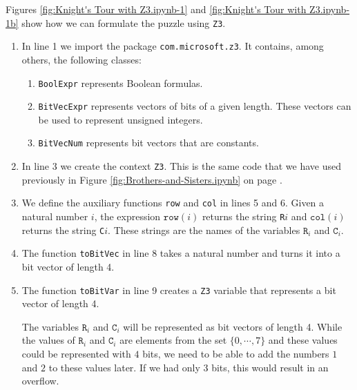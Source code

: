 Figures \ref{fig:Knight's Tour with Z3.ipynb-1} and \ref{fig:Knight's Tour with Z3.ipynb-1b} show how we can
formulate the puzzle using \texttt{Z3}.
\begin{enumerate}
\item In line 1 we import the package \texttt{com.microsoft.z3}.  It contains, among others, the following
      classes:
      \begin{enumerate}
      \item \texttt{BoolExpr} represents Boolean formulas.
      \item \texttt{BitVecExpr} represents vectors of bits of a given length.  These vectors can be used to
            represent unsigned integers.
      \item \texttt{BitVecNum} represents bit vectors that are constants.
      \end{enumerate}
  
\item In line 3 we create the context \texttt{Z3}.
      This is the same code that we have used previously in Figure \ref{fig:Brothers-and-Sisters.ipynb} on page
      \pageref{fig:Brothers-and-Sisters.ipynb}.  
\item We define the auxiliary functions \texttt{row} and \texttt{col} in lines 5 and 6.
      Given a natural number $i$, the expression $\mathtt{row}(i)$ returns the string
      \texttt{R}$i$\texttt{} and  $\mathtt{col}(i)$ returns the string
      \texttt{C}$i$\texttt{}.  These strings are the names of the
      variables $\mathtt{R}_i$ and $\mathtt{C}_i$.
\item The function \texttt{toBitVec} in line 8 takes a natural number and turns it into a bit vector of length 4.
\item The function \texttt{toBitVar} in line 9 creates a \texttt{Z3} variable that represents a bit vector of
      length 4.

      The variables $\mathtt{R}_i$ and $\mathtt{C}_i$ will be represented as bit vectors of length 4.
      While the values of $\mathtt{R}_i$ and $\mathtt{C}_i$  are elements from the set $\{0, \cdots, 7\}$ and
      these values could be represented with $4$ bits, we need to be able to add the numbers $1$ and $2$ to
      these values later.  If we had only $3$ bits, this would result in an overflow. 
      

\end{enumerate}
